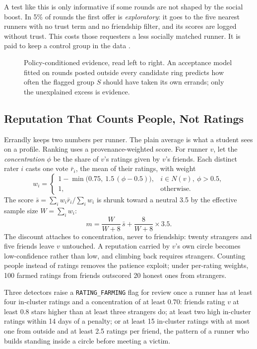 \documentclass[journal]{IEEEtran}
\newcommand{\code}[1]{\texttt{#1}}
\begin{document}
A test like this is only informative if some rounds are not shaped by the social
boost. In 5\% of rounds the first offer is \emph{exploratory}: it goes to the five
nearest runners with no trust term and no friendship filter, and its scores are
logged without trust. This costs those requesters a less socially matched runner. It
is paid to keep a control group in the data \cite{li2010contextual,bottou2013counterfactual}.

\begin{figure}[!t]
\centering

\caption{Policy-conditioned evidence, read left to right. An acceptance model fitted
on rounds posted outside every candidate ring predicts how often the flagged group
$S$ should have taken its own errands; only the unexplained excess is evidence.}
\label{fig:policy}
\end{figure}

\subsection{Reputation That Counts People, Not Ratings}\label{sec:design-reputation}
Errandly keeps two numbers per runner. The plain average is what a student sees on a
profile. Ranking uses a provenance-weighted score. For runner $v$, let the
\emph{concentration} $\phi$ be the share of $v$'s ratings given by $v$'s friends.
Each distinct rater $i$ casts one vote $\bar r_i$, the mean of their ratings, with
weight
\begin{equation}
w_i = \begin{cases}1-\min\bigl(0.75,\ 1.5\,(\phi-0.5)\bigr), & i\in N(v),\ \phi>0.5,\\
1, & \text{otherwise.}\end{cases}
\end{equation}
The score $\bar s=\sum_i w_i\bar r_i/\sum_i w_i$ is shrunk toward a neutral 3.5 by the
effective sample size $W=\sum_i w_i$:
\begin{equation}
m = \frac{W}{W+8}\,\bar s + \frac{8}{W+8}\times3.5 .
\end{equation}
The discount attaches to concentration, never to friendship: twenty strangers and
five friends leave $v$ untouched. A reputation carried by $v$'s own circle becomes
low-confidence rather than low, and climbing back requires strangers. Counting people
instead of ratings removes the patience exploit; under per-rating weights, 100 farmed
ratings from friends outscored 20 honest ones from strangers.

Three detectors raise a \code{RATING\_FARMING} flag for review once a runner has at
least four in-cluster ratings and a concentration of at least 0.70: friends rating
$v$ at least 0.8 stars higher than at least three strangers do; at least two
high in-cluster ratings within 14 days of a penalty; or at least 15 in-cluster
ratings with at most one from outside and at least 2.5 ratings per friend, the
pattern of a runner who builds standing inside a circle before meeting a victim.
\end{document}
